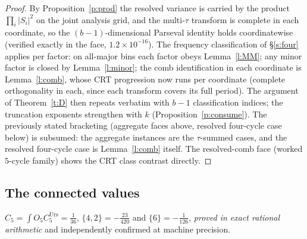 \documentclass[11pt]{article}
\numberwithin{equation}{section}
\theoremstyle{definition}
\theoremstyle{remark}
\begin{document}
\begin{proof}
By Proposition~\ref{p:prod} the resolved variance is carried by
the product $\prod_i|S_i|^2$ on the joint analysis grid, and the
multi-$\tau$ transform is complete in each coordinate, so the
$(b-1)$-dimensional Parseval identity holds coordinatewise
(verified exactly in the face, $1.2\times10^{-16}$). The
frequency classification of \S\ref{s:four} applies per factor:
on all-major bins each factor obeys Lemma~\ref{l:MM}; any minor
factor is closed by Lemma~\ref{l:minor}; the comb identification
in each coordinate is Lemma~\ref{l:comb}, whose CRT progression
now runs per coordinate (complete orthogonality in each, since
each transform covers its full period). The argument of
Theorem~\ref{t:D} then repeats verbatim with $b-1$ classification
indices; the truncation exponents strengthen with $k$
(Proposition~\ref{p:consume}). The previously stated bracketing
(aggregate faces above, resolved four-cycle case below) is
subsumed: the aggregate instances are the $\tau$-summed cases,
and the resolved four-cycle case is Lemma~\ref{l:comb} itself.
The resolved-comb face (worked $5$-cycle family) shows the CRT
class contrast directly.
\end{proof}

\subsection{The connected values}\label{s:five:conn}

$C_5=\int O_5C_5^{\mathrm{Urs}}=\tfrac1{36}$,
$\{4,2\}=-\tfrac{23}{420}$ and $\{6\}=-\tfrac1{126}$,
\emph{proved in exact rational arithmetic} and independently
confirmed at machine precision.
\end{document}
